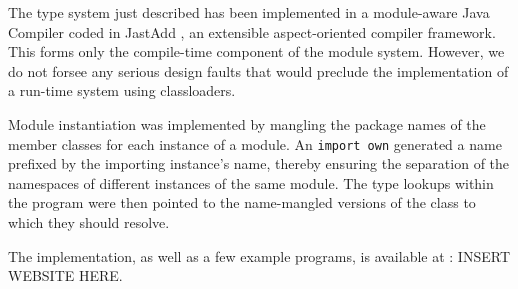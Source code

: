 The type system just described has been implemented in a
module-aware Java Compiler coded in JastAdd \cite{jastadd},
an extensible aspect-oriented compiler framework. This forms
only the compile-time component of the module system. However,
we do not forsee any serious design faults that would preclude
the implementation of a run-time system using classloaders.

Module instantiation was implemented by mangling
the package names of the member classes for each instance of 
a module. An \texttt{import own} generated a name prefixed by 
the importing instance's name, thereby ensuring the separation
of the namespaces of different instances of the same module.
The type lookups within the program were then pointed to the
name-mangled versions of the class to which they should resolve.

The implementation, as well as a few example programs, is available at : INSERT WEBSITE HERE.










